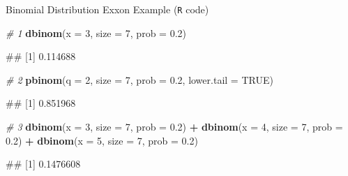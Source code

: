 \documentclass[12pt,ignorenonframetext,compress]{beamer}
\newenvironment{Shaded}{\begin{snugshade}}{\end{snugshade}}
\newcommand{\KeywordTok}[1]{\textcolor[rgb]{0.13,0.29,0.53}{\textbf{#1}}}
\newcommand{\DataTypeTok}[1]{\textcolor[rgb]{0.13,0.29,0.53}{#1}}
\newcommand{\DecValTok}[1]{\textcolor[rgb]{0.00,0.00,0.81}{#1}}
\newcommand{\FloatTok}[1]{\textcolor[rgb]{0.00,0.00,0.81}{#1}}
\newcommand{\StringTok}[1]{\textcolor[rgb]{0.31,0.60,0.02}{#1}}
\newcommand{\CommentTok}[1]{\textcolor[rgb]{0.56,0.35,0.01}{\textit{#1}}}
\newcommand{\OtherTok}[1]{\textcolor[rgb]{0.56,0.35,0.01}{#1}}
\newcommand{\OperatorTok}[1]{\textcolor[rgb]{0.81,0.36,0.00}{\textbf{#1}}}
\newcommand{\NormalTok}[1]{#1}
\let\oldShaded\Shaded
\let\endoldShaded\endShaded
\renewenvironment{Shaded}{\scriptsize\oldShaded}{\endoldShaded}
\let\oldverbatim\verbatim
\let\endoldverbatim\endverbatim
\renewenvironment{verbatim}{\scriptsize\oldverbatim}{\endoldverbatim}
\begin{document}
\begin{frame}[fragile]{Binomial Distribution Exxon Example (\texttt{R}
code)}

\begin{Shaded}
\begin{Highlighting}[]
\CommentTok{# 1}
\KeywordTok{dbinom}\NormalTok{(}\DataTypeTok{x =} \DecValTok{3}\NormalTok{, }\DataTypeTok{size =} \DecValTok{7}\NormalTok{, }\DataTypeTok{prob =} \FloatTok{0.2}\NormalTok{)}
\end{Highlighting}
\end{Shaded}

\begin{verbatim}
## [1] 0.114688
\end{verbatim}

\begin{Shaded}
\begin{Highlighting}[]
\CommentTok{# 2}
\KeywordTok{pbinom}\NormalTok{(}\DataTypeTok{q =} \DecValTok{2}\NormalTok{, }\DataTypeTok{size =} \DecValTok{7}\NormalTok{, }\DataTypeTok{prob =} \FloatTok{0.2}\NormalTok{, }\DataTypeTok{lower.tail =} \OtherTok{TRUE}\NormalTok{)}
\end{Highlighting}
\end{Shaded}

\begin{verbatim}
## [1] 0.851968
\end{verbatim}

\begin{Shaded}
\begin{Highlighting}[]
\CommentTok{# 3}
\KeywordTok{dbinom}\NormalTok{(}\DataTypeTok{x =} \DecValTok{3}\NormalTok{, }\DataTypeTok{size =} \DecValTok{7}\NormalTok{, }\DataTypeTok{prob =} \FloatTok{0.2}\NormalTok{) }\OperatorTok{+}\StringTok{ }
\StringTok{  }\KeywordTok{dbinom}\NormalTok{(}\DataTypeTok{x =} \DecValTok{4}\NormalTok{, }\DataTypeTok{size =} \DecValTok{7}\NormalTok{, }\DataTypeTok{prob =} \FloatTok{0.2}\NormalTok{) }\OperatorTok{+}\StringTok{ }
\StringTok{  }\KeywordTok{dbinom}\NormalTok{(}\DataTypeTok{x =} \DecValTok{5}\NormalTok{, }\DataTypeTok{size =} \DecValTok{7}\NormalTok{, }\DataTypeTok{prob =} \FloatTok{0.2}\NormalTok{)}
\end{Highlighting}
\end{Shaded}

\begin{verbatim}
## [1] 0.1476608
\end{verbatim}

\end{frame}
\end{document}
